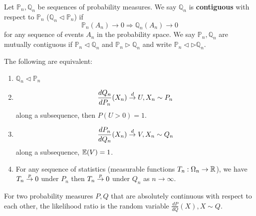 \begin{defn}
  \label{defn:parametric_statistical_models:11}
  Let $\mathbb{P}_{n}, \mathbb{Q}_{n}$ be sequences of probability
  measures.  We say $\mathbb{Q}_{n}$ is \textbf{contiguous} with
  respect to $\mathbb{P}_{n}$ ($\mathbb{Q}_{n} \lhd \mathbb{P}_{n}$) if
  \begin{equation}
    \label{eq:90}
    \mathbb{P}_{n}(A_{n}) \rightarrow 0 \Rightarrow
    \mathbb{Q}_{n}(A_{n}) \rightarrow 0
  \end{equation} for any sequence of events $A_{n}$ in the probability
  space.  We say $\mathbb{P}_{n}, \mathbb{Q}_{n}$ are mutually
  contiguous if $\mathbb{P}_{n} \lhd \mathbb{Q}_{n}$ and
  $\mathbb{P}_{n} \rhd \mathbb{Q}_{n}$ and write $\mathbb{P}_{n} \lhd
  \rhd \mathbb{Q}_{n}$.
\end{defn}

\begin{lem}
  The following are equivalent:
  \begin{enumerate}
  \item $\mathbb{Q}_{n} \lhd \mathbb{P}_{n}$
  \item
    \begin{equation}
      \label{eq:91}
      \frac{dQ_{n}}{dP_{n}}(X_{n}) \overset{d}{\rightarrow} U, X_{n} \sim P_{n}
    \end{equation} along a subsequence, then $P(U > 0) = 1$.
  \item
    \begin{equation}
      \label{eq:92}
      \frac{dP_{n}}{dQ_{n}}(X_{n}) \overset{d}{\rightarrow} V, X_{n} \sim Q_{n}
    \end{equation} along a subsequence, $\E{V} = 1$.
  \item For any sequence of statistics (measurable functions $T_{n} :
    \Omega_{n} \rightarrow \mathbb{R}$), we have $T_{n} \overset{p}{\rightarrow} 0$ under $P_{n}$
    then $T_{n} \overset{p}{\rightarrow} 0$ under $Q_{n}$ as $n \rightarrow \infty$.
  \end{enumerate}
\end{lem}

\begin{remark}
  For two probability measures $P, Q$ that are absolutely continuous with
  respect to each other, the likelihood ratio is the random variable
  $\frac{dP}{dQ}(X), X \sim Q$.
\end{remark}

